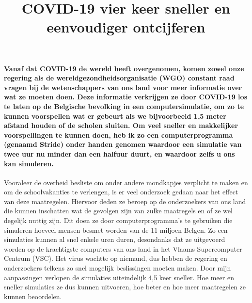 \documentclass[10pt]{article} %
\title{COVID-19 vier keer sneller en eenvoudiger ontcijferen}
\author{}
\date{}
\begin{document}
\maketitle

\vspace{-70px}
\noindent \textbf{Vanaf dat COVID-19 de wereld heeft overgenomen, komen zowel onze regering als de wereldgezondheidsorganisatie (WGO) constant raad vragen bij de wetenschappers van ons land voor meer informatie over wat ze moeten doen. Deze informatie verkrijgen ze door COVID-19 los te laten op de Belgische bevolking in een computersimulatie, om zo te kunnen voorspellen wat er gebeurt als we bijvoorbeeld 1,5 meter afstand houden of de scholen sluiten. Om veel sneller en makkelijker voorspellingen te kunnen doen, heb ik zo een computerprogramma (genaamd Stride) onder handen genomen waardoor een simulatie van twee uur nu minder dan een halfuur duurt, en waardoor zelfs u ons kan simuleren.}
\\\\
Vooraleer de overheid besliste om onder andere mondkapjes verplicht te maken en om de schoolvakanties te verlengen, is er veel onderzoek gedaan naar het effect van deze maatregelen. Hiervoor deden ze beroep op de onderzoekers van ons land die kunnen inschatten wat de gevolgen zijn van zulke maatregels en of ze wel degelijk nuttig zijn. Dit doen ze door computerprogramma's te gebruiken die simuleren hoeveel mensen besmet worden van de 11 miljoen Belgen. Zo een simulaties kunnen al snel enkele uren duren, desondanks dat ze uitgevoerd worden op de krachtigste computers van ons land in het Vlaams Supercomputer Centrum (VSC). Het virus wachtte op niemand, dus hebben de regering en onderzoekers telkens zo snel mogelijk beslissingen moeten maken. Door mijn aanpassingen verlopen de simulaties uiteindelijk 4,5 keer sneller. Hoe meer en sneller simulaties ze dus kunnen uitvoeren, hoe beter en hoe meer maatregelen ze kunnen beoordelen.
\end{document}
